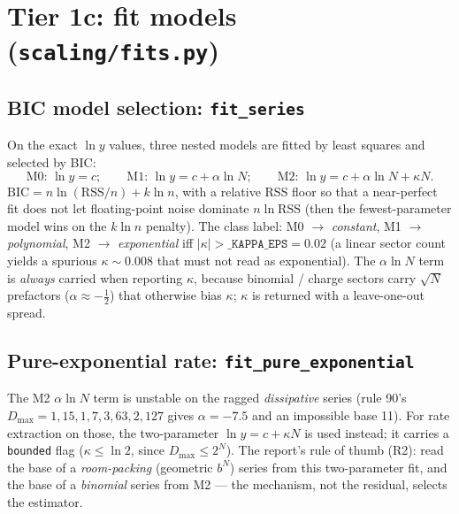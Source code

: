 \documentclass[11pt]{article}
\newcommand{\pf}[1]{\texttt{#1}}          %
\newcommand{\fn}[1]{\texttt{#1}}          %
\begin{document}
\section{Tier 1c: fit models (\pf{scaling/fits.py})}
\label{sec:fits}

\subsection{BIC model selection: \fn{fit\_series}}
On the exact $\ln y$ values, three nested models are fitted by least squares and
selected by BIC:
\[
\text{M0: }\ln y=c;\qquad
\text{M1: }\ln y=c+\alpha\ln N;\qquad
\text{M2: }\ln y=c+\alpha\ln N+\kappa N.
\]
$\text{BIC}=n\ln(\mathrm{RSS}/n)+k\ln n$, with a relative RSS floor so that a
near-perfect fit does not let floating-point noise dominate $n\ln\mathrm{RSS}$
(then the fewest-parameter model wins on the $k\ln n$ penalty). The class label:
M0 $\to$ \emph{constant}, M1 $\to$ \emph{polynomial}, M2 $\to$ \emph{exponential}
iff $|\kappa|>\fn{\_KAPPA\_EPS}=0.02$ (a linear sector count yields a spurious
$\kappa\!\sim\!0.008$ that must not read as exponential). The $\alpha\ln N$ term
is \emph{always} carried when reporting $\kappa$, because binomial / charge
sectors carry $\sqrt N$ prefactors ($\alpha\approx-\tfrac12$) that otherwise bias
$\kappa$; $\kappa$ is returned with a leave-one-out spread.

\subsection{Pure-exponential rate: \fn{fit\_pure\_exponential}}
The M2 $\alpha\ln N$ term is unstable on the ragged \emph{dissipative} series
(rule 90's $D_{\max}=1,15,1,7,3,63,2,127$ gives $\alpha=-7.5$ and an impossible
base 11). For rate extraction on those, the two-parameter $\ln y=c+\kappa N$ is
used instead; it carries a \fn{bounded} flag ($\kappa\le\ln2$, since
$D_{\max}\le2^N$). The report's rule of thumb (R2): read the base of a
\emph{room-packing} (geometric $b^N$) series from this two-parameter fit, and the
base of a \emph{binomial} series from M2 --- the mechanism, not the residual,
selects the estimator.
\end{document}
